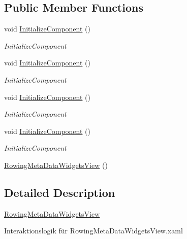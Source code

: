 \subsection*{Public Member Functions}
\begin{DoxyCompactItemize}
\item 
void \hyperlink{class_rowing_monitor_1_1_view_1_1_rowing_meta_data_widgets_view_a156acf6faf9d7cd9925d2e164052d3d6}{Initialize\+Component} ()
\begin{DoxyCompactList}\small\item\em Initialize\+Component \end{DoxyCompactList}\item 
void \hyperlink{class_rowing_monitor_1_1_view_1_1_rowing_meta_data_widgets_view_a156acf6faf9d7cd9925d2e164052d3d6}{Initialize\+Component} ()
\begin{DoxyCompactList}\small\item\em Initialize\+Component \end{DoxyCompactList}\item 
void \hyperlink{class_rowing_monitor_1_1_view_1_1_rowing_meta_data_widgets_view_a156acf6faf9d7cd9925d2e164052d3d6}{Initialize\+Component} ()
\begin{DoxyCompactList}\small\item\em Initialize\+Component \end{DoxyCompactList}\item 
void \hyperlink{class_rowing_monitor_1_1_view_1_1_rowing_meta_data_widgets_view_a156acf6faf9d7cd9925d2e164052d3d6}{Initialize\+Component} ()
\begin{DoxyCompactList}\small\item\em Initialize\+Component \end{DoxyCompactList}\item 
\hyperlink{class_rowing_monitor_1_1_view_1_1_rowing_meta_data_widgets_view_a115912abc22b1d4f20694f03f5974502}{Rowing\+Meta\+Data\+Widgets\+View} ()
\end{DoxyCompactItemize}


\subsection{Detailed Description}
\hyperlink{class_rowing_monitor_1_1_view_1_1_rowing_meta_data_widgets_view}{Rowing\+Meta\+Data\+Widgets\+View} 

Interaktionslogik für Rowing\+Meta\+Data\+Widgets\+View.\+xaml 

